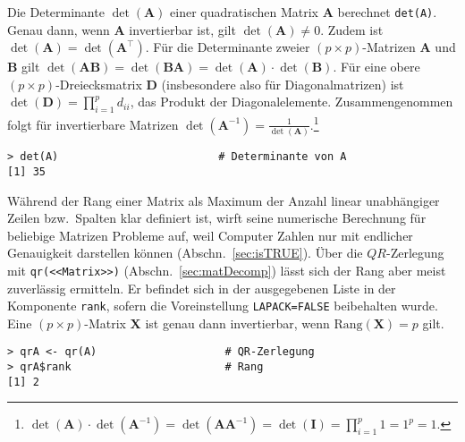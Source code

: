 Die Determinante $\det(\bm{A})$ einer quadratischen Matrix $\bm{A}$ berechnet \lstinline!det(A)!. Genau dann, wenn $\bm{A}$ invertierbar ist, gilt $\det(\bm{A}) \neq 0$. Zudem ist $\det(\bm{A}) = \det(\bm{A}^{\top})$. Für die Determinante zweier $(p \times p)$-Matrizen $\bm{A}$ und $\bm{B}$ gilt $\det(\bm{A} \bm{B}) = \det(\bm{B} \bm{A}) = \det(\bm{A}) \cdot \det(\bm{B})$. Für eine obere $(p \times p)$-Dreiecksmatrix $\bm{D}$ (insbesondere also für Diagonalmatrizen) ist $\det(\bm{D}) = \prod_{i=1}^{p} d_{ii}$, das Produkt der Diagonalelemente. Zusammengenommen folgt für invertierbare Matrizen $\det(\bm{A}^{-1}) = \frac{1}{\det(\bm{A})}$.\footnote{$\det(\bm{A}) \cdot \det(\bm{A}^{-1}) = \det(\bm{A} \bm{A}^{-1}) = \det(\bm{I}) = \prod_{i=1}^{p} 1 = 1^{p} = 1$.}
\begin{lstlisting}
> det(A)                         # Determinante von A
[1] 35
\end{lstlisting}

Während der Rang einer Matrix als Maximum der Anzahl linear unabhängiger Zeilen bzw.\ Spalten klar definiert ist, wirft seine numerische Berechnung für beliebige Matrizen Probleme auf, weil Computer Zahlen nur mit endlicher Genauigkeit darstellen können (Abschn.\ \ref{sec:isTRUE}). Über die $QR$-Zerlegung mit \lstinline!qr(<<Matrix>>)! (Abschn.\ \ref{sec:matDecomp}) lässt sich der Rang aber meist zuverlässig ermitteln. Er befindet sich in der ausgegebenen Liste in der Komponente \lstinline!rank!, sofern die Voreinstellung \lstinline!LAPACK=FALSE! beibehalten wurde. Eine $(p \times p)$-Matrix $\bm{X}$ ist genau dann invertierbar, wenn $\text{Rang}(\bm{X}) = p$ gilt.
\begin{lstlisting}
> qrA <- qr(A)                    # QR-Zerlegung
> qrA$rank                        # Rang
[1] 2
\end{lstlisting}


